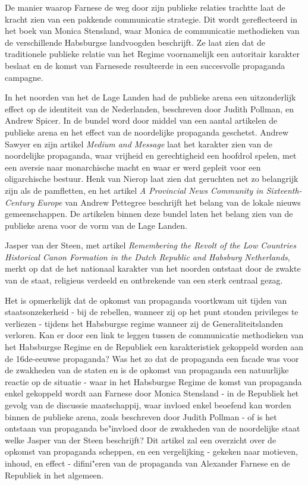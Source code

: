 \documentclass[11pt]{amsart}
\begin{document}
De manier waarop Farnese de weg door zijn publieke relaties trachtte laat de kracht zien van een pakkende communicatie
strategie. Dit wordt gereflecteerd in het boek van Monica Stensland, waar Monica de communicatie methodieken van de
verschillende Habsburgse landvoogden beschrijft. Ze laat zien dat de traditionele publieke relatie van het Regime
voornamelijk een autoritair karakter beslaat en de komst van Farnesede resulteerde in een succesvolle propaganda
campagne\autocite{stenslandHabsburgCommunicationDutch2012}.

In het noorden van het de Lage Landen had de publieke arena een uitzonderlijk effect op de identiteit van de
Nederlanden, beschreven door Judith Pollman, en Andrew Spicer\autocite{pollmannPublicOpinionChanging2007}. In de bundel
word door middel van een aantal artikelen de publieke arena en het effect van de noordelijke propaganda geschetst.
Andrew Sawyer en zijn artikel \textit{Medium and Message} laat het karakter zien van de noordelijke propaganda, waar
vrijheid en gerechtigheid een hoofdrol spelen, met een aversie naar monarchische macht en waar er werd gepleit voor een
oligarchische bestuur. Henk van Nierop\autocite{vannieropYeShallHear2007} laat zien dat geruchten net zo belangrijk
zijn als de pamfletten, en het artikel \textit{A Provincial News Community in Sixteenth-Century Europe} van Andrew
Pettegree\autocite{pettegreeProvincialNewsCommunity2007} beschrijft het belang van de lokale nieuws gemeenschappen. De
artikelen binnen deze bundel laten het belang zien van de publieke arena voor de vorm van de Lage Landen.

Jasper van der Steen, met artikel \textit{Remembering the Revolt of the Low Countries Historical Canon Formation in the
     Dutch Republic and Habsburg Netherlands}\autocite{vandersteenRememberingRevoltLow2018}, merkt op dat de het nationaal
karakter van het noorden ontstaat door de zwakte van de staat, religieus verdeeld en ontbrekende van een sterk centraal
gezag.

Het is opmerkelijk dat de opkomst van propaganda voortkwam uit tijden van staatsonzekerheid - bij de rebellen, wanneer
zij op het punt stonden privileges te verliezen - tijdens het Habsburgse regime wanneer zij de Generaliteitslanden
verloren. Kan er door een link te leggen tussen de communicatie methodieken van het Habsburgse Regime en de Republiek
een karakteristiek gekoppeld worden aan de 16de-eeuwse propaganda? Was het zo dat de propaganda een facade was voor de
zwakheden van de staten en is de opkomst van propaganda een natuurlijke reactie op de situatie - waar in het Habsburgse
Regime de komst van propaganda enkel gekoppeld wordt aan Farnese door Monica Stensland - in de Republiek het gevolg van
de discussie maatschappij, waar invloed enkel beoefend kan worden binnen de publieke arena, zoals beschreven door
Judith Pollman - of is het ontstaan van propaganda be"invloed door de zwakheden van de noordelijke staat welke Jasper
van der Steen beschrijft? Dit artikel zal een overzicht over de opkomst van propaganda scheppen, en een vergelijking -
gekeken naar motieven, inhoud, en effect - difini"eren van de propaganda van Alexander Farnese en de Republiek in het
algemeen.
\end{document}
